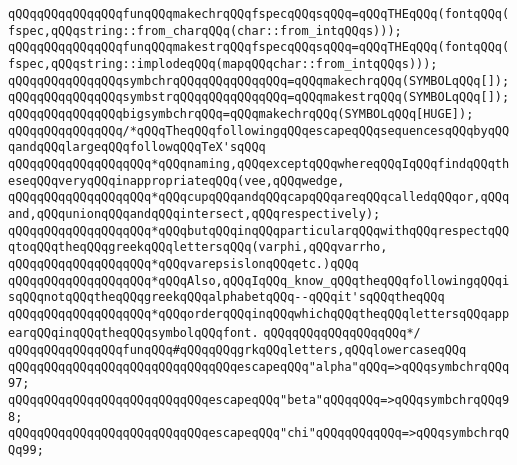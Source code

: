 \newline
\verb|qQQqqQQqqQQqqQQqfunqQQqmakechrqQQqfspecqQQqsqQQq=qQQqTHEqQQq(fontqQQq(fspec,qQQqstring::from_charqQQq(char::from_intqQQqs)));|\newline
\verb|qQQqqQQqqQQqqQQqfunqQQqmakestrqQQqfspecqQQqsqQQq=qQQqTHEqQQq(fontqQQq(fspec,qQQqstring::implodeqQQq(mapqQQqchar::from_intqQQqs)));|\newline
\newline
\verb|qQQqqQQqqQQqqQQqsymbchrqQQqqQQqqQQqqQQq=qQQqmakechrqQQq(SYMBOLqQQq[]);|\newline
\verb|qQQqqQQqqQQqqQQqsymbstrqQQqqQQqqQQqqQQq=qQQqmakestrqQQq(SYMBOLqQQq[]);|\newline
\verb|qQQqqQQqqQQqqQQqbigsymbchrqQQq=qQQqmakechrqQQq(SYMBOLqQQq[HUGE]);|\newline
\newline
\verb|qQQqqQQqqQQqqQQq/*qQQqTheqQQqfollowingqQQqescapeqQQqsequencesqQQqbyqQQqandqQQqlargeqQQqfollowqQQqTeX'sqQQq|\newline
\verb|qQQqqQQqqQQqqQQqqQQq*qQQqnaming,qQQqexceptqQQqwhereqQQqIqQQqfindqQQqtheseqQQqveryqQQqinappropriateqQQq(vee,qQQqwedge,|\newline
\verb|qQQqqQQqqQQqqQQqqQQq*qQQqcupqQQqandqQQqcapqQQqareqQQqcalledqQQqor,qQQqand,qQQqunionqQQqandqQQqintersect,qQQqrespectively);|\newline
\verb|qQQqqQQqqQQqqQQqqQQq*qQQqbutqQQqinqQQqparticularqQQqwithqQQqrespectqQQqtoqQQqtheqQQqgreekqQQqlettersqQQq(varphi,qQQqvarrho,|\newline
\verb|qQQqqQQqqQQqqQQqqQQq*qQQqvarepsislonqQQqetc.)qQQq|\newline
\verb|qQQqqQQqqQQqqQQqqQQq*qQQqAlso,qQQqIqQQq_know_qQQqtheqQQqfollowingqQQqisqQQqnotqQQqtheqQQqgreekqQQqalphabetqQQq--qQQqit'sqQQqtheqQQq|\newline
\verb|qQQqqQQqqQQqqQQqqQQq*qQQqorderqQQqinqQQqwhichqQQqtheqQQqlettersqQQqappearqQQqinqQQqtheqQQqsymbolqQQqfont.|\newline
\verb|qQQqqQQqqQQqqQQqqQQq*/|\newline
\newline
\verb|qQQqqQQqqQQqqQQqfunqQQq#qQQqqQQqgrkqQQqletters,qQQqlowercaseqQQq|\newline
\verb|qQQqqQQqqQQqqQQqqQQqqQQqqQQqqQQqescapeqQQq"alpha"qQQq=>qQQqsymbchrqQQq97;|\newline
\verb|qQQqqQQqqQQqqQQqqQQqqQQqqQQqescapeqQQq"beta"qQQqqQQq=>qQQqsymbchrqQQq98;|\newline
\verb|qQQqqQQqqQQqqQQqqQQqqQQqqQQqescapeqQQq"chi"qQQqqQQqqQQq=>qQQqsymbchrqQQq99;|\newline
